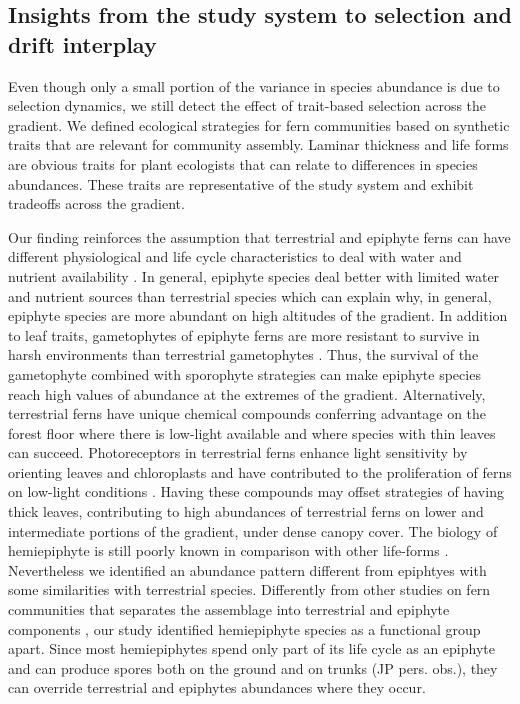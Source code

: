 \documentclass[12pt]{article}
\begin{document}

\subsection*{Insights from the study system to selection and drift interplay}

Even though only a small portion of the variance in species abundance is due to selection dynamics, we still detect the effect of trait-based selection across the gradient. We defined ecological strategies for fern communities based on synthetic traits that are relevant for community assembly. Laminar thickness and life forms are obvious traits for plant ecologists that can relate to differences in species abundances. These traits are representative of the study system and exhibit tradeoffs across the gradient. 

Our finding reinforces the assumption that terrestrial and epiphyte ferns can have different physiological and life cycle characteristics to deal with water and nutrient availability \citep{Page2002, Watkins2012}. In general, epiphyte species deal better with limited water and nutrient sources than terrestrial species \citep{Page2002, Schuettpelz2009, Watkins2012} which can explain why, in general, epiphyte species are more  abundant on high altitudes of the gradient. In addition to leaf traits, gametophytes of epiphyte ferns are more resistant to survive in harsh environments than terrestrial gametophytes \citep{Watkins2012}. Thus, the survival of the gametophyte combined with sporophyte strategies can make epiphyte species reach high values of abundance at the extremes of the gradient. Alternatively, terrestrial ferns have unique chemical compounds conferring advantage on the forest floor where there is low-light available \citep{Kawai2003} and where species with thin leaves can succeed. Photoreceptors in terrestrial ferns enhance light sensitivity by orienting leaves and chloroplasts and have contributed to the proliferation of ferns on low-light conditions \citep{Kawai2003}. Having these compounds may offset strategies of having thick leaves, contributing to high abundances of terrestrial ferns on lower and intermediate portions of the gradient, under dense canopy
cover. The biology of hemiepiphyte is still poorly known in comparison with other life-forms \citep{Watkins2012}. Nevertheless we identified an abundance pattern different from epiphtyes with some similarities with terrestrial species. Differently from other studies on fern communities that separates the assemblage into terrestrial and epiphyte components \citep{WatkinsJr2006, Kluge2010}, our study identified hemiepiphyte species as a functional group apart. Since most hemiepiphytes spend only part of its life cycle as an epiphyte and can produce spores both on the ground and on trunks (JP pers. obs.), they can override terrestrial and epiphytes abundances where they occur. 
\end{document}
